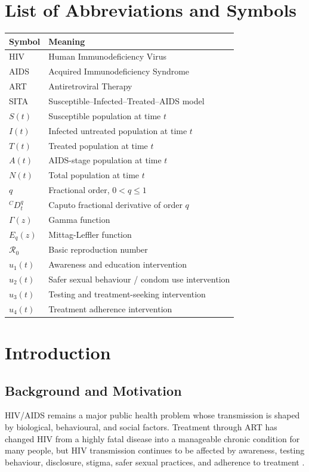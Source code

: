 \documentclass[12pt,a4paper,oneside]{report}
\newcommand{\Rzero}{\mathcal{R}_0}
\newcommand{\CaputoD}[2]{{}^{C}D_{#1}^{#2}}
\begin{document}
\chapter*{List of Abbreviations and Symbols}
\begin{longtable}{p{3cm}p{10cm}}
\toprule
\textbf{Symbol} & \textbf{Meaning}\\
\midrule
HIV & Human Immunodeficiency Virus\\
AIDS & Acquired Immunodeficiency Syndrome\\
ART & Antiretroviral Therapy\\
SITA & Susceptible--Infected--Treated--AIDS model\\
$S(t)$ & Susceptible population at time $t$\\
$I(t)$ & Infected untreated population at time $t$\\
$T(t)$ & Treated population at time $t$\\
$A(t)$ & AIDS-stage population at time $t$\\
$N(t)$ & Total population at time $t$\\
$q$ & Fractional order, $0<q\leq 1$\\
$\CaputoD{t}{q}$ & Caputo fractional derivative of order $q$\\
$\Gamma(z)$ & Gamma function\\
$E_q(z)$ & Mittag-Leffler function\\
$\Rzero$ & Basic reproduction number\\
$u_1(t)$ & Awareness and education intervention\\
$u_2(t)$ & Safer sexual behaviour / condom use intervention\\
$u_3(t)$ & Testing and treatment-seeking intervention\\
$u_4(t)$ & Treatment adherence intervention\\
\bottomrule
\end{longtable}

\newpage
{}

\chapter{Introduction}

\section{Background and Motivation}
HIV/AIDS remains a major public health problem whose transmission is shaped by biological, behavioural, and social factors. Treatment through ART has changed HIV from a highly fatal disease into a manageable chronic condition for many people, but HIV transmission continues to be affected by awareness, testing behaviour, disclosure, stigma, safer sexual practices, and adherence to treatment \citep{WHO2025HIV,UNAIDS2025FactSheet}.
\end{document}
